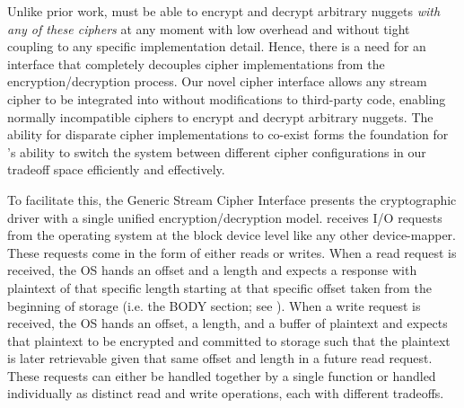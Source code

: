 Unlike prior work, \sys{} must be able to encrypt and decrypt
arbitrary nuggets \emph{with any of these ciphers} at any moment with
low overhead and without tight coupling to any specific implementation
detail. Hence, there is a need for an interface that completely
decouples cipher implementations from the encryption/decryption
process.  Our novel cipher interface allows any stream
cipher to be integrated into \sys{} without modifications to
third-party code, enabling normally incompatible ciphers to encrypt
and decrypt arbitrary nuggets. The ability for disparate cipher
implementations to co-exist forms the foundation for \sys{}'s
ability to switch the system between different cipher configurations
in our tradeoff space efficiently and effectively.  

To facilitate this, the Generic Stream Cipher Interface presents the
cryptographic driver with a single unified encryption/decryption model.
\sys{} receives I/O requests from the operating system at the block device
level like any other device-mapper. These requests come in the form of either
reads or writes. When a read request is received, the OS hands \sys{} an
offset and a length and expects a response with plaintext of that specific
length starting at that specific offset taken from the beginning of storage
(i.e. the BODY section; see ). When a write request is
received, the OS hands \sys{} an offset, a length, and a buffer of
plaintext and expects that plaintext to be encrypted and committed to storage
such that the plaintext is later retrievable given that same offset and length
in a future read request. These requests can either be handled together by a
single function or handled individually as distinct read and write operations,
each with different tradeoffs.

